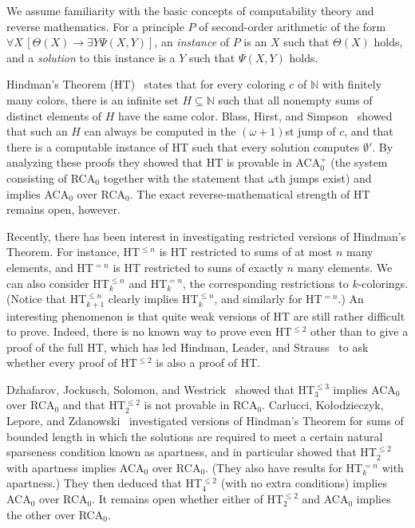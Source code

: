 \documentclass{amsart}
\theoremstyle{definition}
\renewcommand{\leq}{\leqslant}
\begin{document}
We assume familiarity with the basic concepts of computability theory
and reverse mathematics. For a principle $P$ of second-order
arithmetic of the form $\forall X\,[\Theta(X) \rightarrow \exists Y
\Psi(X,Y)]$, an \emph{instance} of $P$ is an $X$ such that
$\Theta(X)$ holds, and a \emph{solution} to this instance is a $Y$
such that $\Psi(X,Y)$ holds.

Hindman's Theorem (HT)~\cite{Hindman} states that for every coloring
$c$ of $\mathbb N$ with finitely many colors, there is an infinite set
$H \subseteq \mathbb N$ such that all nonempty sums of distinct
elements of $H$ have the same color. Blass, Hirst, and
Simpson~\cite{BHS} showed that such an $H$ can always be computed in
the $(\omega+1)$st jump of $c$, and that there is a computable
instance of HT such that every solution computes $\emptyset'$. By
analyzing these proofs they showed that HT is provable in ACA$_0^+$
(the system consisting of RCA$_0$ together with the statement that
$\omega$th jumps exist) and implies ACA$_0$ over RCA$_0$. The exact
reverse-mathematical strength of HT remains open, however.

Recently, there has been interest in investigating restricted versions
of Hindman's Theorem. For instance, HT$^{\leq n}$ is HT restricted to
sums of at most $n$ many elements, and HT$^{=n}$ is HT restricted to sums
of exactly $n$ many elements. We can also consider HT$^{\leq n}_k$ and
HT$^{=n}_k$, the corresponding restrictions to $k$-colorings. (Notice
that HT$^{\leq n}_{k+1}$ clearly implies HT$^{\leq n}_k$, and
similarly for HT$^{=n}$.) An interesting phenomenon is that quite weak
versions of HT are still rather difficult to prove. Indeed, there is
no known way to prove even HT$^{\leq 2}$ other than to give a proof of
the full HT, which has led Hindman, Leader, and Strauss~\cite{HLS} to
ask whether every proof of HT$^{\leq 2}$ is also a proof of HT.

Dzhafarov, Jockusch, Solomon, and Westrick~\cite{DJSW} showed that
HT$^{\leq 3}_3$ implies ACA$_0$ over RCA$_0$ and that HT$^{\leq 2}_2$
is not provable in RCA$_0$. Carlucci, Ko\l{}odzieczyk, Lepore, and
Zdanowski~\cite{CKLZ} investigated versions of Hindman's Theorem for
sums of bounded length in which the solutions are required to meet a
certain natural sparseness condition known as apartness, and in particular
showed that HT$^{\leq 2}_2$ with apartness implies ACA$_0$ over
RCA$_0$. (They also have results for HT$^{=n}_k$ with apartness.) They
then deduced that HT$^{\leq 2}_4$ (with no extra conditions) implies
ACA$_0$ over RCA$_0$. It remains open whether either of HT$^{\leq
  2}_2$ and ACA$_0$ implies the other over RCA$_0$.
\end{document}
